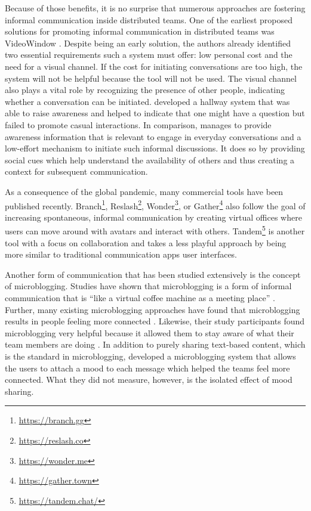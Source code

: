 Because of those benefits, it is no surprise that numerous approaches are fostering informal communication inside distributed teams. One of the earliest proposed solutions for promoting informal communication in distributed teams was VideoWindow \autocite{fish1990videowindow}. Despite being an early solution, the authors already identified two essential requirements such a system must offer: low personal cost and the need for a visual channel. If the cost for initiating conversations are too high, the system will not be helpful because the tool will not be used. The visual channel also plays a vital role by recognizing the presence of other people, indicating whether a conversation can be initiated. \textcite{sasaki1999video} developed a hallway system that was able to raise awareness and helped to indicate that one might have a question but failed to promote casual interactions. In comparison, \textcite{lou2012presencescape} manages to provide awareness information that is relevant to engage in everyday conversations and a low-effort mechanism to initiate such informal discussions. It does so by providing social cues which help understand the availability of others and thus creating a context for subsequent communication.

As a consequence of the global pandemic, many commercial tools have been published recently. Branch\footnote{\url{https://branch.gg}}, Reslash\footnote{\url{https://reslash.co}}, Wonder\footnote{\url{https://wonder.me}}, or Gather\footnote{\url{https://gather.town}} also follow the goal of increasing spontaneous, informal communication by creating virtual offices where users can move around with avatars and interact with others. Tandem\footnote{\url{https://tandem.chat/}} is another tool with a focus on collaboration and takes a less playful approach by being more similar to traditional communication apps user interfaces.

Another form of communication that has been studied extensively is the concept of microblogging. Studies have shown that microblogging is a form of informal communication \autocite{ehrlich2010microblogging} that is \enquote{like a virtual coffee machine as a meeting place} \autocite[p.~158]{ebner2008microblogging}. Further, many existing microblogging approaches have found that microblogging results in people feeling more connected \autocite{ehrlich2010microblogging, zhang2010case}. Likewise, their study participants found microblogging very helpful because it allowed them to stay aware of what their team members are doing \autocite{zhang2010case}. In addition to purely sharing text-based content, which is the standard in microblogging, \textcite{dullemond2013fixing} developed a microblogging system that allows the users to attach a mood to each message which helped the teams feel more connected. What they did not measure, however, is the isolated effect of mood sharing.

